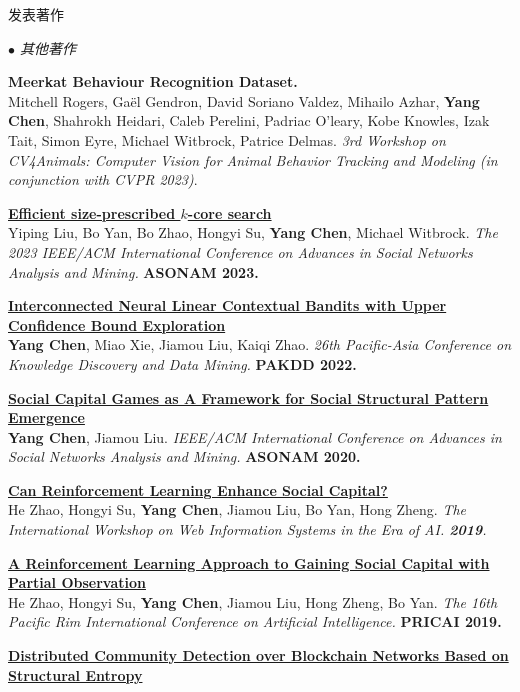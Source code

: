 \documentclass{resume} %
\begin{document}
\begin{rSection}{发表著作}
\begin{rSubsection}{\large\em $\bullet$ 其他著作}{}{}{}
	\item {\bf Meerkat Behaviour Recognition Dataset.}\\Mitchell Rogers, Gaël Gendron, David Soriano Valdez, Mihailo Azhar, \textbf{Yang Chen}, Shahrokh Heidari, Caleb Perelini, Padriac O'leary, Kobe Knowles, Izak Tait, Simon Eyre, Michael Witbrock, Patrice Delmas. {\em 3rd Workshop on CV4Animals: Computer Vision for Animal Behavior Tracking and Modeling (in conjunction with CVPR 2023)}.
\item {\href{}{\bf Efficient size-prescribed $k$-core search}}\\
		Yiping Liu, Bo Yan, Bo Zhao, Hongyi Su, \textbf{Yang Chen}, Michael Witbrock. {\em The 2023 IEEE/ACM International Conference on Advances in Social Networks Analysis and Mining.} \textbf{ASONAM 2023.}\\
\item {\href{}{\bf  Interconnected Neural Linear Contextual Bandits with Upper Confidence Bound Exploration}}\\
		\textbf{Yang Chen}, Miao Xie, Jiamou Liu, Kaiqi Zhao. {\em 26th Pacific-Asia Conference on Knowledge Discovery and Data Mining.} \textbf{PAKDD 2022.}\\
	\item {\href{http://www.ifaamas.org/Proceedings/aamas2020/pdfs/p1807.pdf}{\bf Social Capital Games as A Framework for Social Structural Pattern Emergence}}\\ 
		\textbf{Yang Chen}, Jiamou Liu. {\em IEEE/ACM International Conference on Advances in Social Networks Analysis and Mining.} \textbf{ASONAM 2020.} \\
	\item {\href{https://link.springer.com/chapter/10.1007/978-981-15-3281-8_14}{\bf Can Reinforcement Learning Enhance Social Capital?}}\\
		He Zhao, Hongyi Su, \textbf{Yang Chen}, Jiamou Liu, Bo Yan, Hong Zheng. {\em The International Workshop on Web Information Systems in the Era of AI. {\bf 2019}.}\\
	\item {\href{https://link.springer.com/chapter/10.1007/978-3-030-29908-8_9}{\bf A Reinforcement Learning Approach to Gaining Social Capital with Partial Observation}}\\
		He Zhao, Hongyi Su, \textbf{Yang Chen}, Jiamou Liu, Hong Zheng, Bo Yan. {\em The 16th Pacific Rim International Conference on Artificial Intelligence.} \textbf{PRICAI 2019.}\\
	\item {\href{https://www.researchgate.net/profile/Yang-Chen-67/publication/334358789_Distributed_Community_Detection_over_Blockchain_Networks_Based_on_Structural_Entropy/links/5d281b20299bf1547cadb905/Distributed-Community-Detection-over-Blockchain-Networks-Based-on-Structural-Entropy.pdf}{\bf Distributed Community Detection over Blockchain Networks Based on Structural Entropy}}\\

\end{rSubsection}
\end{rSection}
\end{document}
